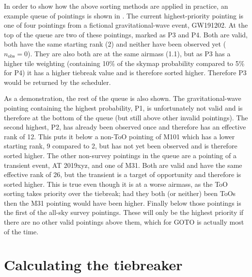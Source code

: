 \begin{colsection}
In order to show how the above sorting methods are applied in practice, an example queue of pointings is shown in . The current highest-priority pointing is one of four pointings from a fictional gravitational-wave event, GW191202. At the top of the queue are two of these pointings, marked as P3 and P4. Both are valid, both have the same starting rank (2) and neither have been observed yet ($n_\text{obs}=0$). They are also both are at the same airmass (1.1), but as P3 has a higher tile weighting (containing 10\% of the skymap probability compared to 5\% for P4) it has a higher tiebreak value and is therefore sorted higher. Therefore P3 would be returned by the scheduler.

As a demonstration, the rest of the queue is also shown. The gravitational-wave pointing containing the highest probability, P1, is unfortunately not valid and is therefore at the bottom of the queue (but still above other invalid pointings). The second highest, P2, has already been observed once and therefore has an effective rank of 12. This puts it below a non-ToO pointing of M101 which has a lower starting rank, 9 compared to 2, but has not yet been observed and is therefore sorted higher. The other non-survey pointings in the queue are a pointing of a transient event, AT 2019xyz, and one of M31. Both are valid and have the same effective rank of 26, but the transient is a target of opportunity and therefore is sorted higher. This is true even though it is at a worse airmass, as the ToO sorting takes priority over the tiebreak; had they both (or neither) been ToOs then the M31 pointing would have been higher. Finally below those pointings is the first of the all-sky survey pointings. These will only be the highest priority if there are no other valid pointings above them, which for GOTO is actually most of the time.

\end{colsection}


\section{Calculating the tiebreaker}
\label{sec:scheduler_tiebreaker}


